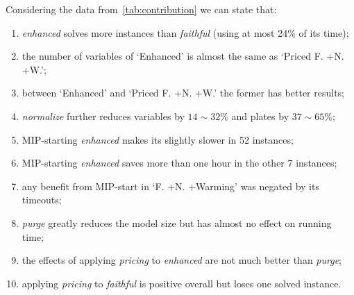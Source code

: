 \documentclass[ppgc,tese,english,formais,babel]{iiufrgs}
\begin{document}
Considering the data from~\cref{tab:contribution} we can state that:
\begin{enumerate}
\item \emph{enhanced} solves more instances than \emph{faithful} (using at most 24\% of its time);
\item the number of variables of `Enhanced' is almost the same as `Priced F. +N. +W.';
\item between `Enhanced' and `Priced F. +N. +W.' the former has better results;
\item \emph{normalize} further reduces variables by \(14\sim32\)\% and plates by \(37\sim65\)\%;
\item MIP-starting \emph{enhanced} makes its slightly slower in 52 instances;
\item MIP-starting \emph{enhanced} saves more than one hour in the other 7 instances;
\item any benefit from MIP-start in `F. +N. +Warming' was negated by its timeouts;
\item \emph{purge} greatly reduces the model size but has almost no effect on running time;
\item the effects of applying \emph{pricing} to \emph{enhanced} are not much better than \emph{purge};
\item applying \emph{pricing} to \emph{faithful} is positive overall but loses one solved instance.
\end{enumerate}
\end{document}
